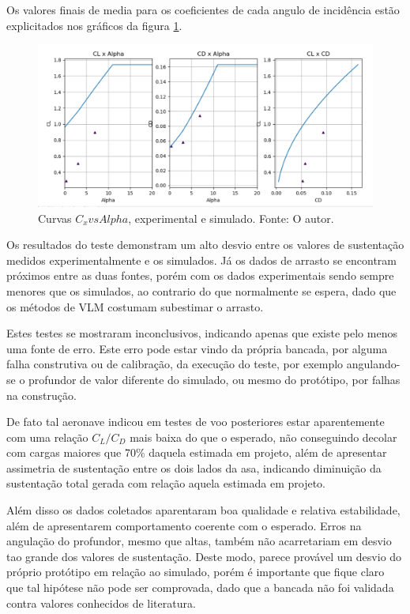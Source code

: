 Os valores finais de media para os coeficientes de cada angulo de incidência estão explicitados nos gráficos da figura \ref{fig:coefficients_alpha_plot}.

\begin{figure}[!ht]
    \centering
    \includegraphics[width=.8\linewidth]{plots/cl_cd_polar_medicao.png}
    \caption{Curvas $C_x vs Alpha$, experimental e simulado. Fonte: O autor.}
    \label{fig:coefficients_alpha_plot}
\end{figure}

Os resultados do teste demonstram um alto desvio entre os valores de sustentação medidos experimentalmente e os simulados. Já os dados de arrasto se encontram próximos entre as duas fontes, porém com os dados experimentais sendo sempre menores que os simulados, ao contrario do que normalmente se espera, dado que os métodos de VLM costumam subestimar o arrasto.

Estes testes se mostraram inconclusivos, indicando apenas que existe pelo menos uma fonte de erro. Este erro pode estar vindo da própria bancada, por alguma falha construtiva ou de calibração, da execução do teste, por exemplo angulando-se o profundor de valor diferente do simulado, ou mesmo do protótipo, por falhas na construção. 

De fato tal aeronave indicou em testes de voo posteriores estar aparentemente com uma relação $C_L/C_D$ mais baixa do que o esperado, não conseguindo decolar com cargas maiores que 70\% daquela estimada em projeto, além de apresentar assimetria de sustentação entre os dois lados da asa, indicando diminuição da sustentação total gerada com relação aquela estimada em projeto.

Além disso os dados coletados aparentaram boa qualidade e relativa estabilidade, além de apresentarem comportamento coerente com o esperado. Erros na angulação do profundor, mesmo que altas, também não acarretariam em desvio tao grande dos valores de sustentação. Deste modo, parece provável um desvio do próprio protótipo em relação ao simulado, porém é importante que fique claro que tal hipótese não pode ser comprovada, dado que a bancada não foi validada contra valores conhecidos de literatura.


